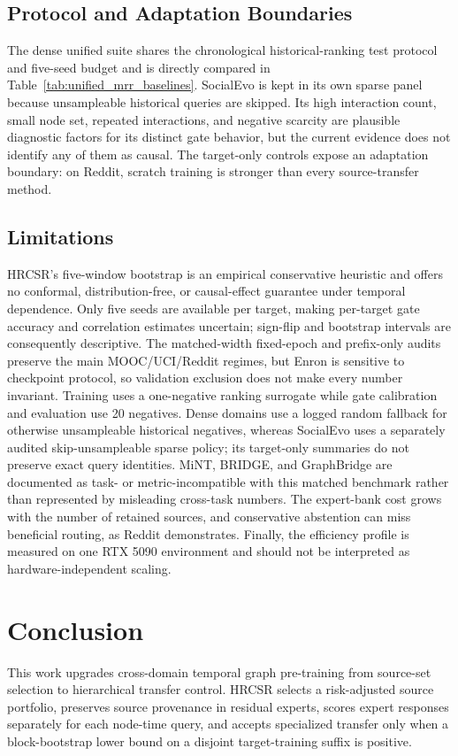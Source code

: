 \documentclass[journal]{IEEEtran}
\begin{document}
\subsection{Protocol and Adaptation Boundaries}
The dense unified suite shares the chronological historical-ranking test protocol and five-seed budget and is directly compared in Table~\ref{tab:unified_mrr_baselines}. SocialEvo is kept in its own sparse panel because unsampleable historical queries are skipped. Its high interaction count, small node set, repeated interactions, and negative scarcity are plausible diagnostic factors for its distinct gate behavior, but the current evidence does not identify any of them as causal. The target-only controls expose an adaptation boundary: on Reddit, scratch training is stronger than every source-transfer method.

\subsection{Limitations}
HRCSR's five-window bootstrap is an empirical conservative heuristic and offers no conformal, distribution-free, or causal-effect guarantee under temporal dependence. Only five seeds are available per target, making per-target gate accuracy and correlation estimates uncertain; sign-flip and bootstrap intervals are consequently descriptive. The matched-width fixed-epoch and prefix-only audits preserve the main MOOC/UCI/Reddit regimes, but Enron is sensitive to checkpoint protocol, so validation exclusion does not make every number invariant. Training uses a one-negative ranking surrogate while gate calibration and evaluation use 20 negatives. Dense domains use a logged random fallback for otherwise unsampleable historical negatives, whereas SocialEvo uses a separately audited skip-unsampleable sparse policy; its target-only summaries do not preserve exact query identities. MiNT, BRIDGE, and GraphBridge are documented as task- or metric-incompatible with this matched benchmark rather than represented by misleading cross-task numbers. The expert-bank cost grows with the number of retained sources, and conservative abstention can miss beneficial routing, as Reddit demonstrates. Finally, the efficiency profile is measured on one RTX 5090 environment and should not be interpreted as hardware-independent scaling.

\section{Conclusion}
This work upgrades cross-domain temporal graph pre-training from source-set selection to hierarchical transfer control. HRCSR selects a risk-adjusted source portfolio, preserves source provenance in residual experts, scores expert responses separately for each node-time query, and accepts specialized transfer only when a block-bootstrap lower bound on a disjoint target-training suffix is positive.
\end{document}

